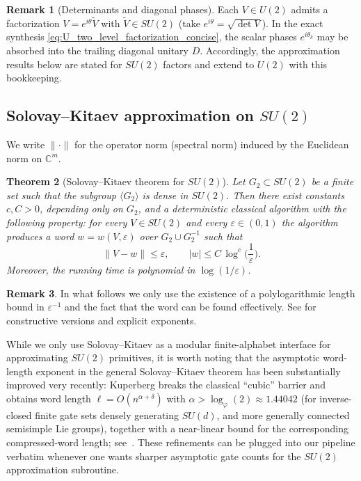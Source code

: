 \documentclass{article}%
\newtheorem{theorem}{Theorem}[section]
\theoremstyle{definition}
\newtheorem{remark}[theorem]{Remark}
\numberwithin{equation}{section}
\newcommand{\C}{\mathbb{C}}
\begin{document}
\begin{remark}[Determinants and diagonal phases]\label{rem:det_bookkeeping}
Each $V\in U(2)$ admits a factorization $V=e^{i\theta}\widetilde V$ with $\widetilde V\in SU(2)$ (take $e^{i\theta}=\sqrt{\det V}$).
In the exact synthesis \eqref{eq:U_two_level_factorization_concise}, the scalar phases $e^{i\theta_k}$ may be absorbed into the trailing diagonal
unitary $D$. Accordingly, the approximation results below are stated for $SU(2)$ factors and extend to $U(2)$ with this bookkeeping.
\end{remark}

\subsection{Solovay--Kitaev approximation on $SU(2)$}
\label{subsec:SK_statement}

We write $\|\cdot\|$ for the operator norm (spectral norm) induced by the Euclidean norm on $\C^m$.

\begin{theorem}[Solovay--Kitaev theorem for $SU(2)$]\label{thm:SK}
Let $G_2\subset SU(2)$ be a finite set such that the subgroup $\langle G_2\rangle$ is dense in $SU(2)$.
Then there exist constants $c,C>0$, depending only on $G_2$, and a deterministic classical algorithm with the following property:
for every $V\in SU(2)$ and every $\varepsilon\in(0,1)$ the algorithm produces a word $w=w(V,\varepsilon)$ over
$G_2\cup G_2^{-1}$ such that
\[
\|V-w\|\le \varepsilon,
\qquad
|w|\le C\,\log^{c}\!\Big(\frac{1}{\varepsilon}\Big).
\]
Moreover, the running time is polynomial in $\log(1/\varepsilon)$.
\end{theorem}

\begin{remark}
In what follows we only use the existence of a polylogarithmic length bound in $\varepsilon^{-1}$ and the fact that the word can be
found effectively. See \cite{Kitaev2002,DawsonNielsen2006} for constructive versions and explicit exponents.
\end{remark}

While we only use Solovay--Kitaev as a modular finite-alphabet interface for approximating $SU(2)$ primitives,
it is worth noting that the asymptotic word-length exponent in the general Solovay--Kitaev theorem has been
substantially improved very recently: Kuperberg breaks the classical ``cubic'' barrier and obtains word length
$\ell = O(n^{\alpha+\delta})$ with $\alpha> \log_{\varphi}(2)\approx 1.44042$ (for inverse-closed finite gate sets
densely generating $SU(d)$, and more generally connected semisimple Lie groups), together with a near-linear
bound for the corresponding compressed-word length; see~\cite{Kuperberg2025BreakingCubicSK}.
These refinements can be plugged into our pipeline verbatim whenever one wants sharper asymptotic gate counts
for the $SU(2)$ approximation subroutine.
\end{document}
